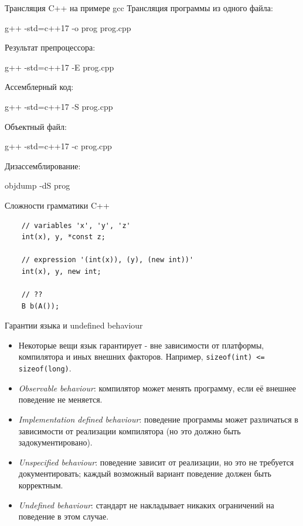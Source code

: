 \documentclass[unknownkeysallowed,xcolor=table]{beamer}
\begin{document}
\begin{frame}[fragile]{Трансляция C++ на примере gcc}
  Трансляция программы из одного файла:
  \begin{cmdlinelarge}
    g++ -std=c++17 -o prog prog.cpp
  \end{cmdlinelarge}
  Результат препроцессора:
  \begin{cmdlinelarge}
    g++ -std=c++17 -E prog.cpp
  \end{cmdlinelarge}
  Ассемблерный код:
  \begin{cmdlinelarge}
    g++ -std=c++17 -S prog.cpp
  \end{cmdlinelarge}
  Объектный файл:
  \begin{cmdlinelarge}
    g++ -std=c++17 -c prog.cpp
  \end{cmdlinelarge}
  Дизассемблирование:
  \begin{cmdlinelarge}
    objdump -dS prog
  \end{cmdlinelarge}
\end{frame}

\begin{frame}[fragile]{Сложности грамматики C++}
  \begin{lstlisting}
    // variables 'x', 'y', 'z'
    int(x), y, *const z;

    // expression '(int(x)), (y), (new int))'
    int(x), y, new int;

    // ??
    B b(A());
  \end{lstlisting}
\end{frame}

\begin{frame}{Гарантии языка и undefined behaviour}
  \begin{itemize}
    \item Некоторые вещи язык гарантирует - вне зависимости от платформы, компилятора и иных внешних факторов. Например, \lstinline{sizeof(int) <= sizeof(long)}.
    \item \emph{Observable behaviour}: компилятор может менять программу, если её внешнее поведение не меняется.
    \item \emph{Implementation defined behaviour}: поведение программы может различаться в зависимости от реализации компилятора (но это должно быть задокументировано).
    \item \emph{Unspecified behaviour}: поведение зависит от реализации, но это не требуется документировать; каждый возможный вариант поведение должен быть корректным.
    \item \emph{Undefined behaviour}: стандарт не накладывает никаких ограничений на поведение в этом случае.
  \end{itemize}
\end{frame}
\end{document}
